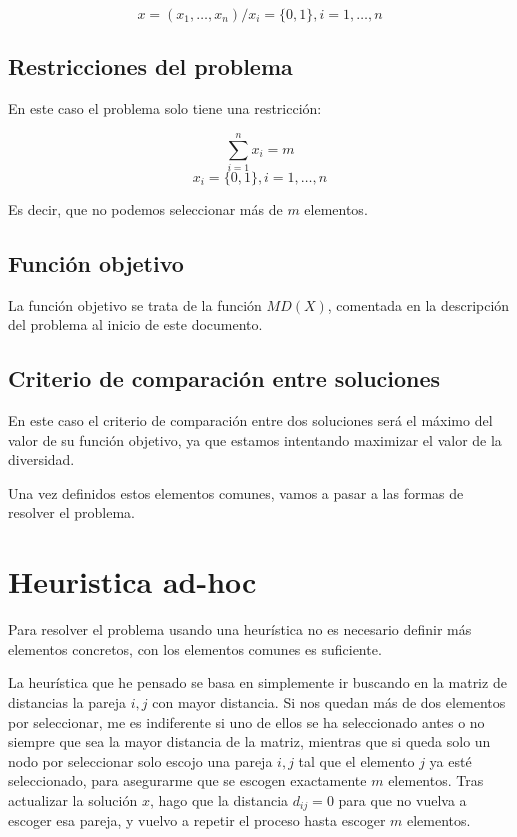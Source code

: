 \[
x = (x_1, \dots, x_n) / x_i = \{0, 1\}, i = 1, \dots, n
\]

\subsection{Restricciones del problema}

En este caso el problema solo tiene una restricción:


\[
\displaystyle\sum_{i=1}^{n} x_i = m
\]
\[
x_i = \{0,1\}, i = 1, \dots, n
\]

Es decir, que no podemos seleccionar más de $m$ elementos.

\subsection{Función objetivo}

La función objetivo se trata de la función $MD(X)$, comentada en la descripción del problema al inicio de este documento.

\subsection{Criterio de comparación entre soluciones}

En este caso el criterio de comparación entre dos soluciones será el máximo del valor de su función objetivo, ya que estamos intentando maximizar el valor de la diversidad.

Una vez definidos estos elementos comunes, vamos a pasar a las formas de resolver el problema.

\newpage

\section{Heuristica ad-hoc}

Para resolver el problema usando una heurística no es necesario definir más elementos concretos, con los elementos comunes es suficiente.

La heurística que he pensado se basa en simplemente ir buscando en la matriz de distancias la pareja $i, j$ con mayor distancia. Si nos quedan más de dos elementos por seleccionar, me es indiferente si uno de ellos se ha seleccionado antes o no siempre que sea la mayor distancia de la matriz, mientras que si queda solo un nodo por seleccionar solo escojo una pareja $i, j$ tal que el elemento $j$ ya esté seleccionado, para asegurarme que se escogen exactamente $m$ elementos. Tras actualizar la solución $x$, hago que la distancia $d_{ij} = 0$ para que no vuelva a escoger esa pareja, y vuelvo a repetir el proceso hasta escoger $m$ elementos.

